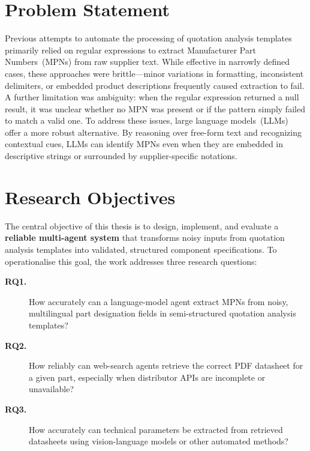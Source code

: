 \section{Problem Statement }
Previous attempts to automate the processing of quotation analysis templates primarily relied on regular expressions to extract Manufacturer Part Numbers~(MPNs) from raw supplier text.  
While effective in narrowly defined cases, these approaches were brittle---minor variations in formatting, inconsistent delimiters, or embedded product descriptions frequently caused extraction to fail.  
A further limitation was ambiguity: when the regular expression returned a null result, it was unclear whether no MPN was present or if the pattern simply failed to match a valid one.  
To address these issues, large language models~(LLMs) offer a more robust alternative.  
By reasoning over free-form text and recognizing contextual cues, LLMs can identify MPNs even when they are embedded in descriptive strings or surrounded by supplier-specific notations.

\section{Research Objectives }
The central objective of this thesis is to design, implement, and evaluate a \textbf{reliable multi-agent system} that transforms noisy inputs from quotation analysis templates into validated, structured component specifications.  
To operationalise this goal, the work addresses three research questions:

\begin{description}
\item[\textbf{RQ1.}] How accurately can a language-model agent extract MPNs from noisy, multilingual part designation fields in semi-structured quotation analysis templates?

\item[\textbf{RQ2.}] How reliably can web-search agents retrieve the correct PDF datasheet for a given part, especially when distributor APIs are incomplete or unavailable?

\item[\textbf{RQ3.}] How accurately can technical parameters be extracted from retrieved datasheets using vision-language models or other automated methods?
\end{description}

